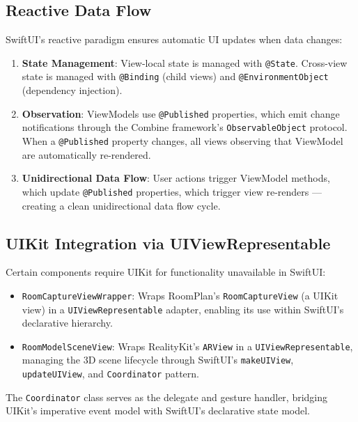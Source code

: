\subsection{Reactive Data Flow}

SwiftUI's reactive paradigm ensures automatic UI updates when data changes:

\begin{enumerate}
    \item \textbf{State Management}: View-local state is managed with \texttt{@State}. Cross-view state is managed with \texttt{@Binding} (child views) and \texttt{@EnvironmentObject} (dependency injection).
    \item \textbf{Observation}: ViewModels use \texttt{@Published} properties, which emit change notifications through the Combine framework's \texttt{ObservableObject} protocol. When a \texttt{@Published} property changes, all views observing that ViewModel are automatically re-rendered.
    \item \textbf{Unidirectional Data Flow}: User actions trigger ViewModel methods, which update \texttt{@Published} properties, which trigger view re-renders — creating a clean unidirectional data flow cycle.
\end{enumerate}


\subsection{UIKit Integration via UIViewRepresentable}

Certain components require UIKit for functionality unavailable in SwiftUI:

\begin{itemize}
    \item \texttt{RoomCaptureViewWrapper}: Wraps RoomPlan's \texttt{RoomCaptureView} (a UIKit view) in a \texttt{UIViewRepresentable} adapter, enabling its use within SwiftUI's declarative hierarchy.
    \item \texttt{RoomModelSceneView}: Wraps RealityKit's \texttt{ARView} in a \texttt{UIViewRepresentable}, managing the 3D scene lifecycle through SwiftUI's \texttt{makeUIView}, \texttt{updateUIView}, and \texttt{Coordinator} pattern.
\end{itemize}

The \texttt{Coordinator} class serves as the delegate and gesture handler, bridging UIKit's imperative event model with SwiftUI's declarative state model.


